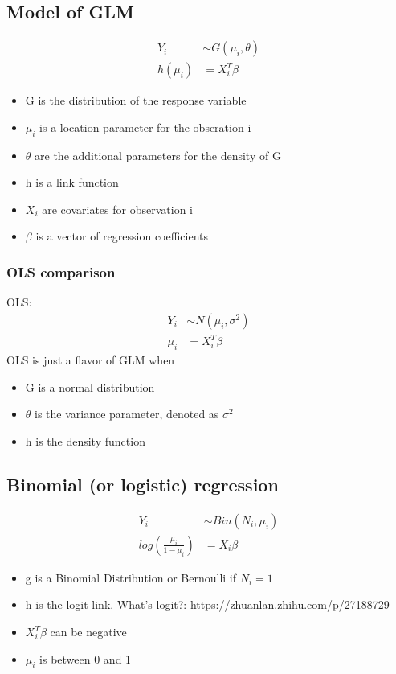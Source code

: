 \documentclass{article}
\theoremstyle{definition}
\theoremstyle{thrm}
\theoremstyle{lma}
\theoremstyle{ppst}
\theoremstyle{crlr}
\begin{document}
\subsection{Model of GLM}
\begin{align*}
	Y_i &\sim G(\mu_i, \theta)\\
	h(\mu_i) &= X_i^T\beta
\end{align*}
\begin{itemize}
	\item G is the distribution of the response variable
	\item $\mu_i$ is a location parameter for the obseration i
	\item $\theta$ are the additional parameters for the density of G
	\item h is a link function
	\item $X_i$ are covariates for observation i
	\item $\beta$ is a vector of regression coefficients
\end{itemize}

\subsubsection{OLS comparison}
OLS:
\begin{align*}
	Y_i &\sim N(\mu_i, \sigma^2)\\
	\mu_i &= X_i^T\beta
\end{align*}
 OLS is just a flavor of GLM when 
 \begin{itemize}
 	\item G is a normal distribution
 	\item $\theta$ is the variance parameter, denoted as $\sigma^2$
 	\item h is the density function
 \end{itemize}

\subsection{Binomial (or logistic) regression}
\begin{align*}
	Y_i &\sim Bin(N_i,\mu_i)\\
	log(\frac{\mu_i}{1-\mu_i})&=X_i\beta
\end{align*}
\begin{itemize}
	\item g is a Binomial Distribution or Bernoulli if $N_i=1$
	\item h is the logit link. What's logit?: \url{https://zhuanlan.zhihu.com/p/27188729}
	\item $X_i^T\beta$ can be negative
	\item $\mu_i$ is between 0 and 1
\end{itemize}
\end{document}
